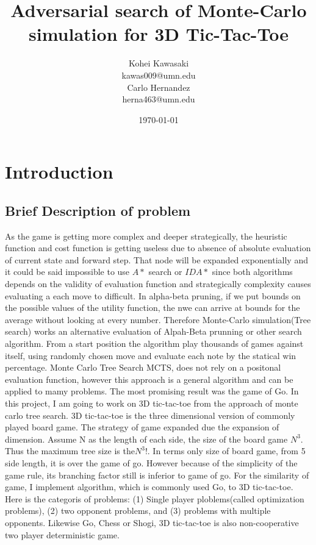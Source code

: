 \documentclass[12pt]{article}
\title{Adversarial search of Monte-Carlo simulation for 3D Tic-Tac-Toe}
\author{
Kohei Kawasaki\\kawas009@umn.edu\\
Carlo Hernandez\\herna463@umn.edu
}
\date{\today}
\begin{document}
\maketitle
\label{sec:rw}
\section{Introduction}

\subsection{Brief Description of problem}
As the game is getting more complex and deeper strategically, the heuristic function and cost function is getting useless due to absence of absolute evaluation of current state and forward step. That node will be expanded exponentially and it could be said impossible to use \(A*\) search or \(IDA*\) since both algorithms depends on the validity of evaluation function and strategically complexity causes evaluating a each move to difficult. In alpha-beta pruning, if we put bounds on the possible values of the utility function, the nwe can arrive at bounds for the average without looking at every number.
Therefore Monte-Carlo simulation(Tree search) works an alternative evaluation of Alpah-Beta prunning or other search algorithm. From a start position the algorithm play thousands of games against itself, using randomly chosen move and evaluate each note by the statical win percentage. Monte Carlo Tree Search MCTS, does not rely on a positonal evaluation function, however this approach is a general algorithm and can be applied to mamy problems. The most promising result was the game of Go. In this project, I am going to work on 3D tic-tac-toe from the approach of monte carlo tree search. 3D tic-tac-toe is the three dimensional version of commonly played board game. The strategy of game expanded due the expansion of dimension. Assume N as the length of each side, the size of the board game \(N^3\). Thus the maximum tree size is the\(N^3!\). In terms only size of board game, from 5 side length, it is over the game of go. However because of the simplicity of the game rule, its branching factor still is inferior to game of go. For the similarity of game, I implement algorithm, which is commonly used Go, to 3D tic-tac-toe. Here is the categoris of problems: (1) Single player ploblems(called optimization problems), (2) two opponent problems, and (3) problems with multiple opponents. Likewise Go, Chess or Shogi, 3D tic-tac-toe is also non-cooperative two player deterministic game. 
\end{document}
